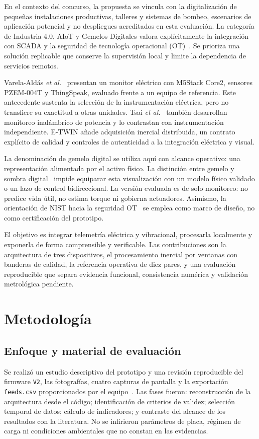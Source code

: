 \documentclass[journal,onecolumn,11pt,a4paper]{IEEEtran}
\begin{document}
En el contexto del concurso, la propuesta se vincula con la digitalización de pequeñas instalaciones productivas, talleres y sistemas de bombeo, escenarios de aplicación potencial y no despliegues acreditados en esta evaluación. La categoría de Industria 4.0, AIoT y Gemelos Digitales valora explícitamente la integración con SCADA y la seguridad de tecnología operacional (OT)~\cite{bases2026}. Se prioriza una solución replicable que conserve la supervisión local y limite la dependencia de servicios remotos.

Varela-Aldás \textit{et al.}~\cite{varela2022} presentan un monitor eléctrico con M5Stack Core2, sensores PZEM-004T y ThingSpeak, evaluado frente a un equipo de referencia. Este antecedente sustenta la selección de la instrumentación eléctrica, pero no transfiere su exactitud a otras unidades. Tsai \textit{et al.}~\cite{tsai2023} también desarrollan monitoreo inalámbrico de potencia y lo contrastan con instrumentación independiente. E-TWIN añade adquisición inercial distribuida, un contrato explícito de calidad y controles de autenticidad a la integración eléctrica y visual.

La denominación de gemelo digital se utiliza aquí con alcance operativo: una representación alimentada por el activo físico. La distinción entre gemelo y sombra digital~\cite{sepasgozar2021} impide equiparar esta visualización con un modelo físico validado o un lazo de control bidireccional. La versión evaluada es de solo monitoreo: no predice vida útil, no estima torque ni gobierna actuadores. Asimismo, la orientación de NIST hacia la seguridad OT~\cite{nist2023} se emplea como marco de diseño, no como certificación del prototipo.

El objetivo es integrar telemetría eléctrica y vibracional, procesarla localmente y exponerla de forma comprensible y verificable. Las contribuciones son la arquitectura de tres dispositivos, el procesamiento inercial por ventanas con banderas de calidad, la referencia operativa de diez pares, y una evaluación reproducible que separa evidencia funcional, consistencia numérica y validación metrológica pendiente.

\section{Metodología}
\subsection{Enfoque y material de evaluación}
Se realizó un estudio descriptivo del prototipo y una revisión reproducible del firmware \texttt{V2}, las fotografías, cuatro capturas de pantalla y la exportación \texttt{feeds.csv} proporcionados por el equipo~\cite{evidencias}. Las fases fueron: reconstrucción de la arquitectura desde el código; identificación de criterios de validez; selección temporal de datos; cálculo de indicadores; y contraste del alcance de los resultados con la literatura. No se infirieron parámetros de placa, régimen de carga ni condiciones ambientales que no constan en las evidencias.
\end{document}
